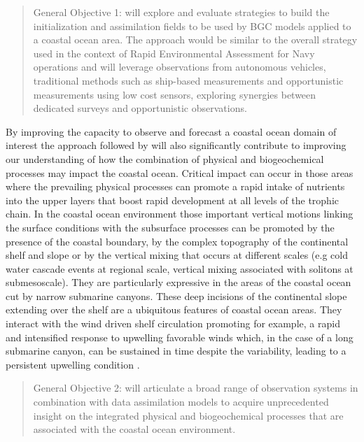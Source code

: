 \begin{quote}
  \textsf{General Objective 1:} \proj will explore and evaluate
  strategies to build the initialization and assimilation fields to be
  used by BGC models applied to a coastal ocean area. The approach
  would be similar to the overall strategy used in the context of
  Rapid Environmental Assessment for Navy operations and will leverage
  observations from autonomous vehicles, traditional methods such as
  ship-based measurements and opportunistic measurements using low
  cost sensors, exploring synergies between dedicated surveys and
  opportunistic observations.
\end{quote}
 
By improving the capacity to observe and forecast a coastal ocean
domain of interest the approach followed by \proj will also
significantly contribute to improving our understanding of how the
combination of physical and biogeochemical processes may impact the
coastal ocean. Critical impact can occur in those areas where the
prevailing physical processes can promote a rapid intake of nutrients
into the upper layers that boost rapid development at all levels of
the trophic chain. In the coastal ocean environment those important
vertical motions linking the surface conditions with the subsurface
processes can be promoted by the presence of the coastal boundary, by
the complex topography of the continental shelf and slope or by the
vertical mixing that occurs at different scales (e.g cold water
cascade events at regional scale, vertical mixing associated with
solitons at submesoscale). They are particularly expressive in the
areas of the coastal ocean cut by narrow submarine canyons. These deep
incisions of the continental slope extending over the shelf are a
ubiquitous features of coastal ocean areas.  They interact with the
wind driven shelf circulation promoting for example, a rapid and
intensified response to upwelling favorable winds \cite{she00} which,
in the case of a long submarine canyon, can be sustained in time
despite the variability, leading to a persistent upwelling condition
\cite{allen00}.

\begin{quote} 
  \textsf{General Objective 2:} \proj will articulate a broad range of
  observation systems in combination with data assimilation models to
  acquire unprecedented insight on the integrated physical and
  biogeochemical processes that are associated with the coastal ocean
  environment.
\end{quote} 

